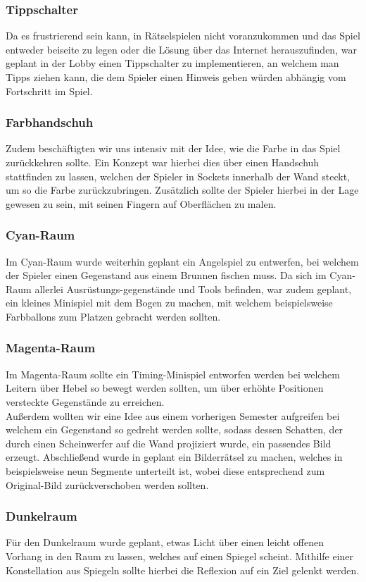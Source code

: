 \subsubsection{Tippschalter}
Da es frustrierend sein kann, in Rätselspielen nicht voranzukommen und das Spiel entweder beiseite zu legen oder die Lösung über das Internet herauszufinden, war geplant in der Lobby einen Tippschalter zu implementieren, an welchem man Tipps ziehen kann, die dem Spieler einen Hinweis geben würden abhängig vom Fortschritt im Spiel.
\subsubsection{Farbhandschuh}
Zudem beschäftigten wir uns intensiv mit der Idee, wie die Farbe in das Spiel zurückkehren sollte. Ein Konzept war hierbei dies über einen Handschuh stattfinden zu lassen, welchen der Spieler in Sockets innerhalb der Wand steckt, um so die Farbe zurückzubringen. Zusätzlich sollte der Spieler hierbei in der Lage gewesen zu sein, mit seinen Fingern auf Oberflächen zu malen.
\subsubsection{Cyan-Raum}
Im Cyan-Raum wurde weiterhin geplant ein Angelspiel zu entwerfen, bei welchem der Spieler einen Gegenstand aus einem Brunnen fischen muss. 
Da sich im Cyan-Raum allerlei Ausrüstungs-gegenstände und Tools befinden, war zudem geplant, ein kleines Minispiel mit dem Bogen zu machen, mit welchem beispielsweise Farbballons zum Platzen gebracht werden sollten.
\subsubsection{Magenta-Raum}
Im Magenta-Raum sollte ein Timing-Minispiel entworfen werden bei welchem Leitern über Hebel so bewegt werden sollten, um über erhöhte Positionen versteckte Gegenstände zu erreichen.\\
Außerdem wollten wir eine Idee aus einem vorherigen Semester aufgreifen bei welchem ein Gegenstand so gedreht werden sollte, sodass dessen Schatten, der durch einen Scheinwerfer auf die Wand projiziert wurde, ein passendes Bild erzeugt. Abschließend wurde in geplant ein Bilderrätsel zu machen, welches in beispielsweise neun Segmente unterteilt ist, wobei diese entsprechend zum Original-Bild zurückverschoben werden sollten. 
\subsubsection{Dunkelraum}
Für den Dunkelraum wurde geplant, etwas Licht über einen leicht offenen Vorhang in den Raum zu lassen, welches auf einen Spiegel scheint. Mithilfe einer Konstellation aus Spiegeln sollte hierbei die Reflexion auf ein Ziel gelenkt werden.


